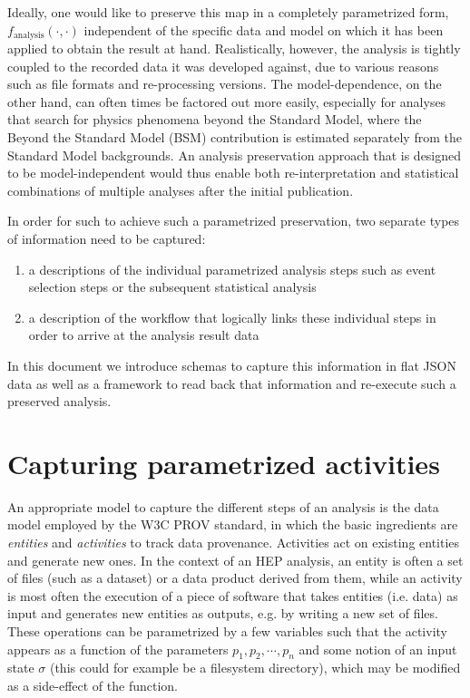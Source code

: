\documentclass[a4paper]{jpconf}
\begin{document}
Ideally, one would like to preserve this map in a completely parametrized form, $f_\mathrm{analysis}(\cdot,\cdot)$ independent of the specific data and model on which it has been applied to obtain the result at hand. Realistically, however, the analysis is tightly coupled to the recorded data it was developed against, due to various reasons such as file formats and re-processing versions. The model-dependence, on the other hand, can often times be factored out more easily, especially for analyses that search for physics phenomena beyond the Standard Model, where the Beyond the Standard Model (BSM) contribution is estimated separately from the Standard Model backgrounds. An analysis preservation approach that is designed to be model-independent would thus enable both re-interpretation and statistical combinations of multiple analyses after the initial publication.

In order for such to achieve such a parametrized preservation, two separate types of information need to be captured:

\begin{enumerate}
	\item a descriptions of the individual parametrized analysis steps such as event selection steps or the subsequent statistical analysis
	\item a description of the workflow that logically links these individual steps in order to arrive at the analysis result data
\end{enumerate}

In this document we introduce schemas to capture this information in flat JSON data as well as a framework to read back that information and re-execute such a preserved analysis.

\section{Capturing parametrized activities}

An appropriate model to capture the different steps of an analysis is the data model employed by the W3C PROV standard\cite{w3c-prov-dm}, in which the basic ingredients are \emph{entities} and \emph{activities} to track data provenance. Activities act on existing entities and generate new ones. In the context of an HEP analysis, an entity is often a set of files (such as a dataset) or a data product derived from them, while an activity is most often the execution of a piece of software that takes entities (i.e. data) as input and generates new entities as outputs, e.g. by writing a new set of files.  These operations can be parametrized by a few variables such that the activity appears as a function of the parameters $p_1,p_2,\cdots,p_n$ and some notion of an input state $\sigma$ (this could for example be a filesystem directory), which may be modified as a side-effect of the function.
\end{document}

